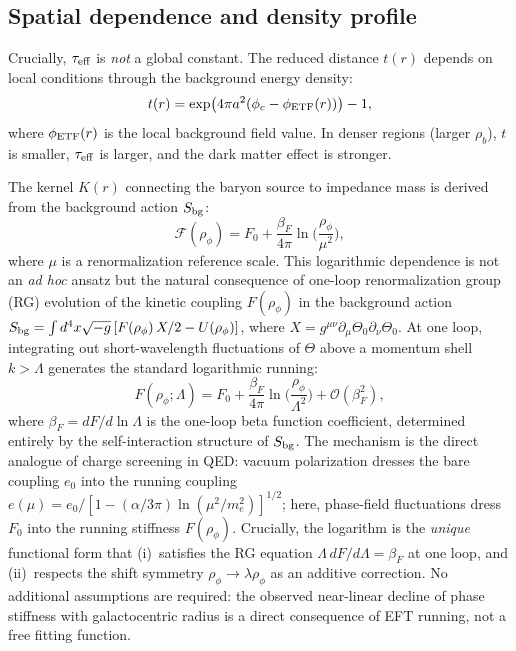 ﻿\documentclass[a4paper,12pt]{article}
\begin{document}
\subsection{Spatial dependence and density profile}

Crucially, $\tau_{\rm eff}$ is \emph{not} a global constant.  The
reduced distance $t(r)$ depends on local conditions through the
background energy density:
\begin{equation}
  t(r) = \exp\!\big(4\pi a^2(\phi_c - \phi_{\rm ETF}(r))\big) - 1,
\end{equation}
where $\phi_{\rm ETF}(r)$ is the local background field value.  In
denser regions (larger $\rho_b$), $t$ is smaller, $\tau_{\rm eff}$ is
larger, and the dark matter effect is stronger.

The kernel $K(r)$ connecting the baryon source to impedance mass is
derived from the background action $S_{\rm bg}$:
\begin{equation}
  \mathcal{F}(\rho_\phi) = F_0 + \frac{\beta_F}{4\pi}\ln\!\bigg(\frac{\rho_\phi}{\mu^2}\bigg),
  \label{eq:kernel}
\end{equation}
where $\mu$ is a renormalization reference scale.
This logarithmic dependence is not an \emph{ad hoc} ansatz but
the natural consequence of one-loop renormalization group (RG) evolution
of the kinetic coupling $F(\rho_\phi)$ in the background action
$S_{\rm bg}=\int d^4x\sqrt{-g}\,[F(\rho_\phi)\,X/2-U(\rho_\phi)]$,
where $X=g^{\mu\nu}\partial_\mu\Theta_0\partial_\nu\Theta_0$.
At one loop, integrating out short-wavelength fluctuations of $\Theta$
above a momentum shell $k>\Lambda$ generates the standard logarithmic
running:
\begin{equation}
  F(\rho_\phi;\Lambda) = F_0 + \frac{\beta_F}{4\pi}
    \ln\!\bigg(\frac{\rho_\phi}{\Lambda^2}\bigg) + \mathcal{O}(\beta_F^2),
  \label{eq:F_RG}
\end{equation}
where $\beta_F = dF/d\ln\Lambda$ is the one-loop beta function
coefficient, determined entirely by the self-interaction structure
of $S_{\rm bg}$.
The mechanism is the direct analogue of charge screening in QED:
vacuum polarization dresses the bare coupling $e_0$ into the running
coupling $e(\mu)=e_0/[1-(\alpha/3\pi)\ln(\mu^2/m_e^2)]^{1/2}$;
here, phase-field fluctuations dress $F_0$ into the running stiffness
$F(\rho_\phi)$.
Crucially, the logarithm is the \emph{unique} functional form that
(i)~satisfies the RG equation $\Lambda\,dF/d\Lambda = \beta_F$ at
one loop, and (ii)~respects the shift symmetry
$\rho_\phi\to\lambda\rho_\phi$ as an additive correction.
No additional assumptions are required: the observed near-linear
decline of phase stiffness with galactocentric radius is a direct
consequence of EFT running, not a free fitting function.
\end{document}
